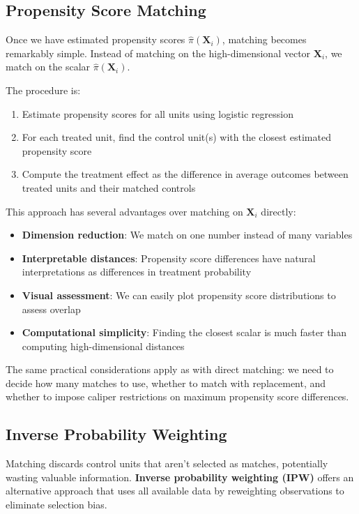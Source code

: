 \documentclass[12pt]{article}
\begin{document}
\begin{multicols}{2}
\subsection*{Propensity Score Matching}

Once we have estimated propensity scores $\hat{\pi}(\bm{X}_i)$, matching becomes remarkably simple.
Instead of matching on the high-dimensional vector $\bm{X}_i$, we match on the scalar $\hat{\pi}(\bm{X}_i)$.

The procedure is:
\begin{enumerate}
  \item Estimate propensity scores for all units using logistic regression
  \item For each treated unit, find the control unit(s) with the closest estimated propensity score
  \item Compute the treatment effect as the difference in average outcomes between treated units and their matched controls
\end{enumerate}

This approach has several advantages over matching on $\bm{X}_i$ directly:
\begin{itemize}
  \item \textbf{Dimension reduction}: We match on one number instead of many variables
  \item \textbf{Interpretable distances}: Propensity score differences have natural interpretations as differences in treatment probability
  \item \textbf{Visual assessment}: We can easily plot propensity score distributions to assess overlap
  \item \textbf{Computational simplicity}: Finding the closest scalar is much faster than computing high-dimensional distances
\end{itemize}

The same practical considerations apply as with direct matching: we need to decide how many matches to use, whether to match with replacement, and whether to impose caliper restrictions on maximum propensity score differences.

\subsection*{Inverse Probability Weighting}

Matching discards control units that aren't selected as matches, potentially wasting valuable information.
\textbf{Inverse probability weighting (IPW)} offers an alternative approach that uses all available data by reweighting observations to eliminate selection bias.


\end{multicols}
\end{document}
